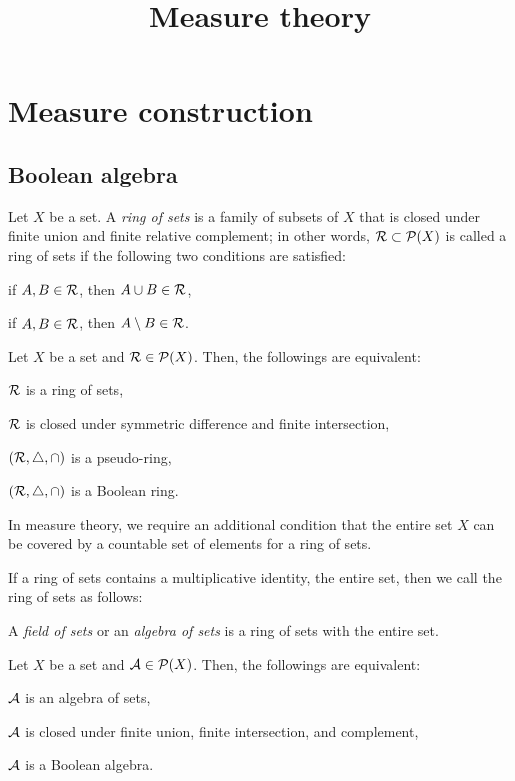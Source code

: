 \documentclass{../exp}
\title{Measure theory}
\begin{document}
\maketitle


\section{Measure construction}

\subsection{Boolean algebra}
\begin{defn}
Let $X$ be a set.
A \emph{ring of sets} is a family of subsets of $X$ that is closed under finite union and finite relative complement; in other words, $\mathcal{R}\subset\mathcal{P}(X)$ is called a ring of sets if the following two conditions are satisfied:
\begin{cond}
\item if $A,B\in\mathcal{R}$, then $A\cup B\in\mathcal{R}$,
\item if $A,B\in\mathcal{R}$, then $A\setminus B\in\mathcal{R}$.
\end{cond}
\end{defn}

\begin{prop}
Let $X$ be a set and $\mathcal{R}\in\mathcal{P}(X)$.
Then, the followings are equivalent:
\begin{cond}
\item $\mathcal{R}$ is a ring of sets,
\item $\mathcal{R}$ is closed under symmetric difference and finite intersection,
\item $(\mathcal{R},\triangle,\cap)$ is a pseudo-ring,
\item $(\mathcal{R},\triangle,\cap)$ is a Boolean ring.
\end{cond}
\end{prop}

\begin{rmk}
In measure theory, we require an additional condition that the entire set $X$ can be covered by a countable set of elements for a ring of sets.
\end{rmk}


If a ring of sets contains a multiplicative identity, the entire set, then we call the ring of sets as follows:
\begin{defn}
A \emph{field of sets} or an \emph{algebra of sets} is a ring of sets with the entire set.
\end{defn}
\begin{prop}
Let $X$ be a set and $\mathcal{A}\in\mathcal{P}(X)$.
Then, the followings are equivalent:
\begin{cond}
\item $\mathcal{A}$ is an algebra of sets,
\item $\mathcal{A}$ is closed under finite union, finite intersection, and complement,
\item $\mathcal{A}$ is a Boolean algebra.
\end{cond}
\end{prop}
\end{document}
